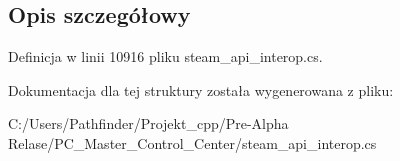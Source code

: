 \subsection{Opis szczegółowy}


Definicja w linii 10916 pliku steam\+\_\+api\+\_\+interop.\+cs.



Dokumentacja dla tej struktury została wygenerowana z pliku\+:\begin{DoxyCompactItemize}
\item 
C\+:/\+Users/\+Pathfinder/\+Projekt\+\_\+cpp/\+Pre-\/\+Alpha Relase/\+P\+C\+\_\+\+Master\+\_\+\+Control\+\_\+\+Center/steam\+\_\+api\+\_\+interop.\+cs\end{DoxyCompactItemize}

